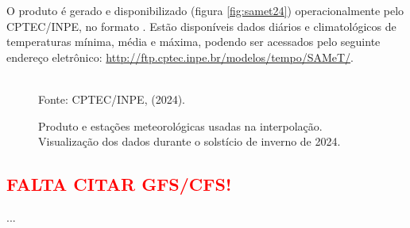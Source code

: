 \indent O produto é gerado e disponibilizado (figura \ref{fig:samet24}) operacionalmente pelo \acrshort{CPTEC}/\acrshort{INPE}, no formato . Estão disponíveis dados diários e climatológicos de temperaturas mínima, média e máxima, podendo ser acessados pelo seguinte endereço eletrônico: \url{http://ftp.cptec.inpe.br/modelos/tempo/SAMeT/}.

\begin{figure}[htbp]
    \centering
    \caption{Produto  e estações meteorológicas usadas na interpolação. Visualização dos dados durante o solstício de inverno de 2024.} %
    \label{fig:samet_obs24}
    \hfill
    \\
    \small{Fonte: \acrshort{CPTEC}/\acrshort{INPE}, \citeauthor{Rozante2021SAMeT} (2024).}
\end{figure}

\subsection{\textcolor{red}{FALTA CITAR GFS/CFS!}}

\indent ...







